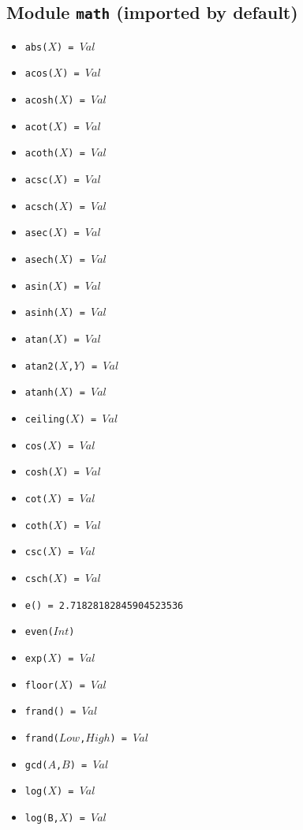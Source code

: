 \documentclass[10pt]{article}
\begin{document}
\begin{multicols}{2}
\section*{Module \texttt{math} (imported by default)}
\begin{scriptsize}
\begin{itemize}
   \item \texttt{abs($X$) = $Val$}
   \item \texttt{acos($X$) = $Val$}
   \item \texttt{acosh($X$) = $Val$}
   \item \texttt{acot($X$) = $Val$}
   \item \texttt{acoth($X$) = $Val$}
   \item \texttt{acsc($X$) = $Val$}
   \item \texttt{acsch($X$) = $Val$}
   \item \texttt{asec($X$) = $Val$}
   \item \texttt{asech($X$) = $Val$}
   \item \texttt{asin($X$) = $Val$}
   \item \texttt{asinh($X$) = $Val$}
   \item \texttt{atan($X$) = $Val$}
   \item \texttt{atan2($X$,$Y$) = $Val$}
   \item \texttt{atanh($X$) = $Val$}
   \item \texttt{ceiling($X$) = $Val$}
   \item \texttt{cos($X$) = $Val$}
   \item \texttt{cosh($X$)  = $Val$}
   \item \texttt{cot($X$) = $Val$}
   \item \texttt{coth($X$)  = $Val$}
   \item \texttt{csc($X$) = $Val$}
   \item \texttt{csch($X$)  = $Val$}
   \item \texttt{e() = 2.71828182845904523536}
   \item \texttt{even($Int$)}
   \item \texttt{exp($X$) = $Val$}
   \item \texttt{floor($X$) = $Val$}
   \item \texttt{frand() = $Val$}
   \item \texttt{frand($Low$,$High$) = $Val$}
   \item \texttt{gcd($A$,$B$) = $Val$}
   \item \texttt{log($X$) = $Val$}
   \item \texttt{log(B,$X$) = $Val$}

\end{itemize}
\end{scriptsize}
\end{multicols}
\end{document}
